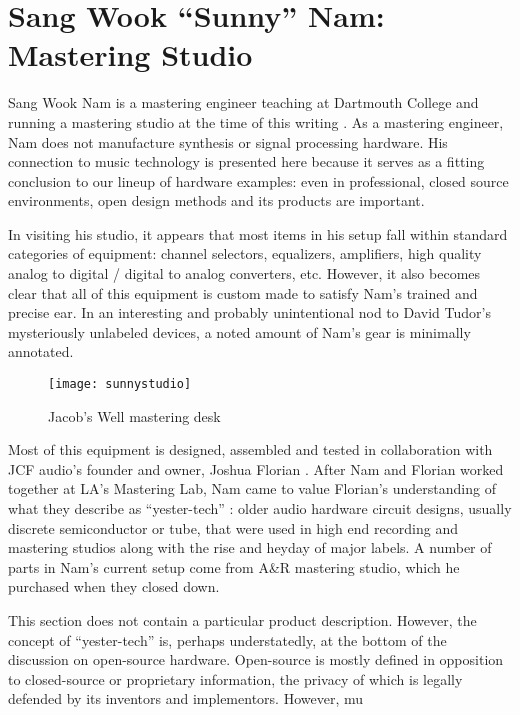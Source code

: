 



\section{Sang Wook ``Sunny'' Nam: Mastering Studio}

Sang Wook Nam is a mastering engineer teaching at Dartmouth College and running a mastering studio at the time of this writing \citep{nam2015}. As a mastering engineer, Nam does not manufacture synthesis or signal processing hardware. His connection to music technology is presented here because it serves as a fitting conclusion to our lineup of hardware examples: even in professional, closed source environments, open design methods and its products are important. 

In visiting his studio, it appears that most items in his setup fall within standard categories of equipment: channel selectors, equalizers, amplifiers, high quality analog to digital / digital to analog converters, etc. However, it also becomes clear that all of this equipment is custom made to satisfy Nam's trained and precise ear. In an interesting and probably unintentional nod to David Tudor's mysteriously unlabeled devices, a noted amount of Nam's gear is minimally annotated. 

	\begin{figure}[h!]
	  \caption{Jacob's Well mastering desk}
	  \centering
	    \texttt{[image: sunnystudio]}
	\end{figure}
	
Most of this equipment is designed, assembled and tested in collaboration with JCF audio's founder and owner, Joshua Florian \citep{florian2015}. After Nam and Florian worked together at LA's Mastering Lab, Nam came to value Florian's understanding of what they describe as ``yester-tech'' \citep{florian2015b}: older audio hardware circuit designs, usually discrete semiconductor or tube, that were used in high end recording and mastering studios along with the rise and heyday of major labels. A number of parts in Nam's current setup come from A\&R mastering studio, which he purchased when they closed down. 



This section does not contain a particular product description. However, the concept of ``yester-tech'' is, perhaps understatedly, at the bottom of the discussion on open-source hardware. Open-source is mostly defined in opposition to closed-source or proprietary information, the privacy of which is legally defended by its inventors and implementors. However, mu

